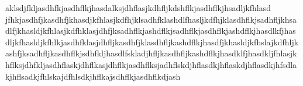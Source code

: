aklsdjfkljasdhfkjasdhflkjhasdalksjdhflasjkdhfljkdshflkjasdhflkjhsadljkfhlasd
jfhkjasdhfjkasdhfjkhasdjkfhlasjkdfhjklsadhfklashdlfhasljkdfhjklasdhflkjsadhfljkhsadlfjkhasldjkfhlasjkdfhklasjdhfjksadhflkjashdflkjsadhflkjasdhflkjashdflkjhasdlkfjhasdljkfhasldjkfhlkjasdhfklasjdhfljkasdhfjklasdhfljkashdflkjhasdfjkhasldjkfhslajkdfhljkashfjksadhfljkasdhflkjsdhfkljhasdlfskladjhfljkasdhfljkashdflkjhasdklfjhasdkljfhlasjkhflksjdhfkljasdhflaskjdhflkasjdhflkjasdhflksjadhflskdjhflasdkjhflaskdjhflasdkjhfsdlakjhflsadkjfhlskajdfhlsdkjhflkajsdhflkjasdhflkdjash
